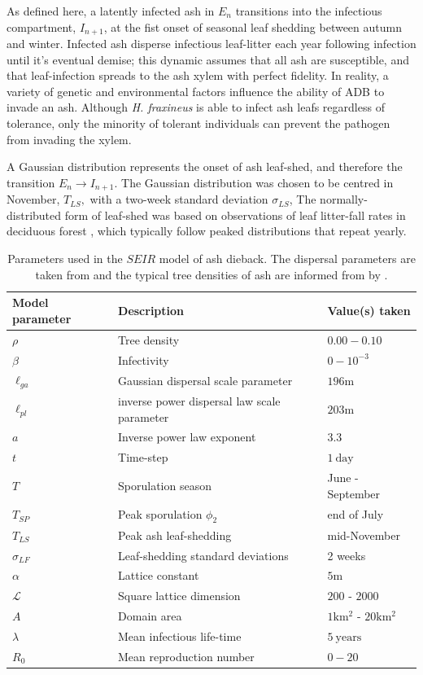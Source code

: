 As defined here, a latently infected ash in $E_n$ transitions into the infectious compartment, $I_{n+1}$, at the fist onset of seasonal leaf shedding between autumn and winter.
Infected ash disperse infectious leaf-litter each year following infection until it's eventual demise;
this dynamic assumes that all ash are susceptible, and that leaf-infection spreads to the ash xylem with perfect fidelity. 
In reality, a variety of genetic and environmental factors influence the ability of ADB to invade an ash.
Although \textit{H. fraxineus} is able to infect ash leafs regardless of tolerance, only the minority of tolerant individuals can prevent the pathogen from invading the xylem.

A Gaussian distribution represents the onset of ash leaf-shed, and therefore the transition $E_n\rightarrow I_{n+1}$.
The Gaussian distribution was chosen to be centred in November, $T_{LS},$ with a two-week standard deviation $\sigma_{LS}$,
The normally-distributed form of leaf-shed was based on observations of leaf litter-fall rates in deciduous forest \cite{zhang2014seasonal, dixon1976analysis}, 
which typically follow peaked distributions that repeat yearly.

\begin{table}[h]
\centering
\begin{tabular}{l l l}
\hline
\textbf{Model parameter} & \textbf{Description} & \textbf{Value(s) taken}\\
\hline
$\rho$  & Tree density & $0.00 - 0.10$ \\ 
$\beta$ & Infectivity & $0 - 10^{-3}$ \\
$\ell_{ga}$ & Gaussian dispersal scale parameter& $196\mathrm{m}$ \\
$\ell_{pl}$ & inverse power dispersal law scale parameter& $203\mathrm{m}$ \\
$a$ & Inverse power law exponent & $3.3$ \\
$t$ & Time-step & $1\ \mathrm{day}$\\
$T$ & Sporulation season & June - September \\
$T_{SP}$ & Peak sporulation $\phi_2$ & end of July \\
$T_{LS}$ & Peak ash leaf-shedding & mid-November \\
$\sigma_{LF}$ & Leaf-shedding standard deviations & 2 weeks \\
$\alpha$ & Lattice constant & $5\mathrm{m}$ \\
$\mathcal{L}$ & Square lattice dimension & $200$ - $2000$ \\
$A$ & Domain area & $1\mathrm{km^2}$ - $20\mathrm{km^2}$ \\
$\lambda$ & Mean infectious life-time & $5\ \mathrm{years}$ \\
$R_0$ & Mean reproduction number & $0-20$ \\
\hline
\end{tabular}
\caption{Parameters used in the $SEIR$ model of ash dieback. The dispersal parameters are taken from \cite{grosdidier2018tracking} and the typical tree densities of ash are informed from by \cite{hill.data}.}
\label{tab:SEIR-model}
\end{table}

